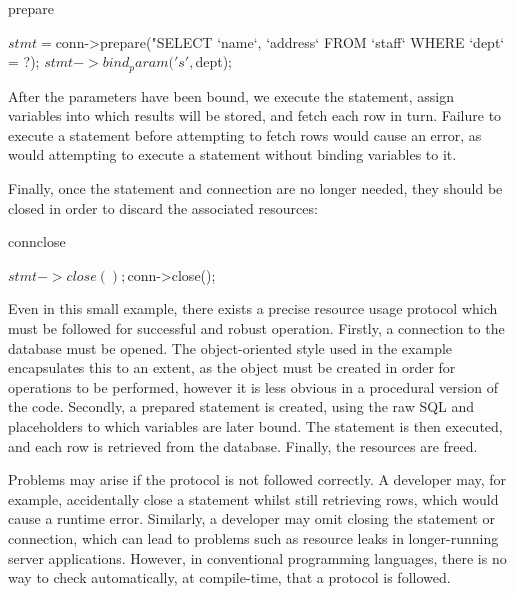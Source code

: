 \begin{SaveVerbatim}{prepare}

  $stmt = $conn->prepare("SELECT `name`, `address` 
     FROM `staff` WHERE `dept` = ?);
  $stmt->bind_param('s', $dept);

\end{SaveVerbatim}

\noindent
After the parameters have been bound, we execute the statement, assign
variables into which results will be stored, and fetch each row in turn. 
Failure to execute a statement before attempting to fetch rows would cause an error, as would attempting to execute a statement without binding variables to it.


\noindent
Finally, once the statement and connection are no longer needed, they should be
closed in order to discard the associated resources:

\begin{SaveVerbatim}{connclose}

  $stmt->close();
  $conn->close();

\end{SaveVerbatim}

\noindent
Even in this small example, there exists a precise resource usage protocol
which must be followed for successful and robust operation.
Firstly, a connection to the database must be opened. The object-oriented style
used in the example encapsulates this to an extent, as the object must be
created in order for operations to be performed, however it is less obvious in
a procedural version of the code. Secondly, a prepared statement is created,
using the raw SQL and placeholders to which variables are later bound. The
statement is then executed, and each row is retrieved from the database.
Finally, the resources are freed. 

Problems may arise if the protocol is not followed correctly.
A developer may, for example, accidentally close a statement whilst still
retrieving rows, which would cause a runtime error. Similarly, a developer may
omit closing the statement or connection, which can lead to
problems such as resource leaks in longer-running server applications.
However, in conventional programming languages, there is no way to check
automatically, at compile-time, that a protocol is followed.

